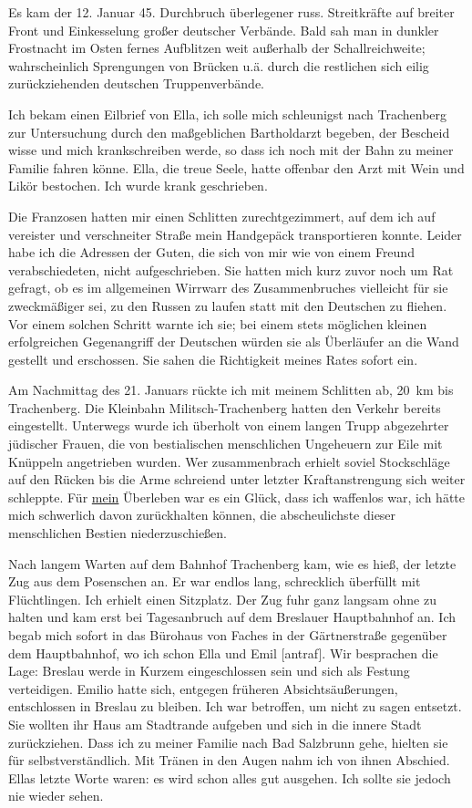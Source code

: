 \documentclass[a5paper,pagesize,10pt,twoside=true]{scrbook}
\renewcommand{\marginpar}[2][]{}
\begin{document}
Es kam der 12. Januar 45. Durchbruch überlegener russ. Streitkräfte auf breiter Front und Einkesselung großer deutscher Verbände. Bald sah man in dunkler Frostnacht im Osten fernes Aufblitzen weit außerhalb der Schallreichweite; wahrscheinlich Sprengungen von Brücken u.ä. durch die restlichen sich eilig zurückziehenden deutschen Truppenverbände.

Ich bekam einen Eilbrief von Ella, ich solle mich schleunigst nach Trachenberg zur Untersuchung durch den maßgeblichen Bartholdarzt begeben, der Bescheid wisse und mich krankschreiben werde, so dass ich noch mit der Bahn zu meiner Familie fahren könne. Ella, die treue Seele, hatte offenbar den Arzt mit Wein und Likör bestochen. Ich wurde krank geschrieben.

\marginpar{53} Die Franzosen hatten mir einen Schlitten zurechtgezimmert, auf dem ich auf vereister und verschneiter Straße mein Handgepäck transportieren konnte. Leider habe ich die Adressen der Guten, die sich von mir wie von einem Freund verabschiedeten, nicht aufgeschrieben. Sie hatten mich kurz zuvor noch um Rat gefragt, ob es im allgemeinen Wirrwarr des Zusammenbruches vielleicht für sie zweckmäßiger sei, zu den Russen zu laufen statt mit den Deutschen zu fliehen. Vor einem solchen Schritt warnte ich sie; bei einem stets möglichen kleinen erfolgreichen Gegenangriff der Deutschen würden sie als Überläufer an die Wand gestellt und erschossen. Sie sahen die Richtigkeit meines Rates sofort ein.

Am Nachmittag des 21. Januars rückte ich mit meinem Schlitten ab, 20~km bis Trachenberg. Die Kleinbahn Militsch-Trachenberg hatten den Verkehr bereits eingestellt. Unterwegs wurde ich überholt von einem langen Trupp abgezehrter jüdischer Frauen, die von bestialischen menschlichen Ungeheuern zur Eile mit Knüppeln angetrieben wurden. Wer zusammenbrach erhielt soviel Stockschläge auf den Rücken bis die Arme schreiend unter letzter Kraftanstrengung sich weiter schleppte. Für \underline{mein} Überleben war es ein Glück, dass ich waffenlos war, ich hätte mich schwerlich davon zurückhalten können, die abscheulichste dieser menschlichen Bestien niederzuschießen.

Nach langem Warten auf dem Bahnhof Trachenberg kam, wie es hieß, der letzte Zug aus dem Posenschen an. Er war endlos lang, schrecklich überfüllt mit Flüchtlingen. Ich erhielt einen Sitzplatz. Der Zug fuhr ganz langsam ohne zu halten und kam erst bei Tagesanbruch auf dem Breslauer Hauptbahnhof an. Ich begab mich sofort in das Bürohaus von Faches in der Gärtnerstraße gegenüber dem Hauptbahnhof, wo ich schon Ella und Emil [antraf]. Wir besprachen die Lage: Breslau werde in Kurzem eingeschlossen sein und sich als Festung verteidigen. Emilio hatte sich, entgegen früheren Absichtsäußerungen, entschlossen in Breslau zu bleiben. Ich war betroffen, um nicht zu sagen entsetzt. Sie wollten ihr Haus am Stadtrande aufgeben und sich in die innere Stadt zurückziehen. Dass ich zu meiner Familie \marginpar{55}nach Bad Salzbrunn gehe, hielten sie für selbstverständlich. Mit Tränen in den Augen nahm ich von ihnen Abschied. Ellas letzte Worte waren: es wird schon alles gut ausgehen. Ich sollte sie jedoch nie wieder sehen.
\end{document}
